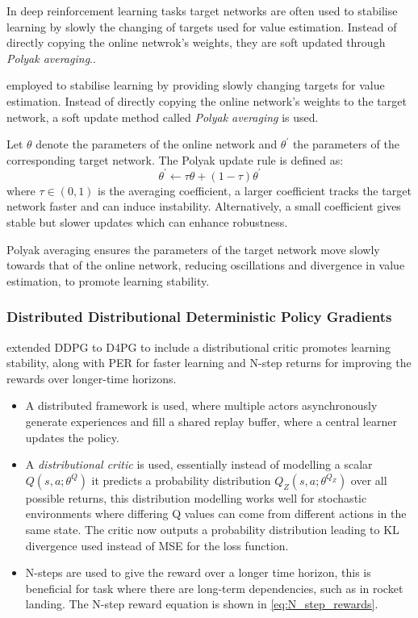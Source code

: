 \begin{tcolorbox}[title={\textbf{Lemma. Target network updates via Polyak averaging}}]
In deep reinforcement learning tasks target networks are often used to stabilise learning by slowly the changing of targets used for value estimation. Instead of directly copying the online netwrok's weights, they are soft updated through \textit{Polyak averaging}..

employed to stabilise learning by providing slowly changing targets for value estimation. Instead of directly copying the online network's weights to the target network, a soft update method called \textit{Polyak averaging} is used.

Let \( \theta \) denote the parameters of the online network and \( \theta^{'}\) the parameters of the corresponding target network. The Polyak update rule is defined as:
\[
    \theta^{'} \leftarrow \tau \theta + (1 - \tau) \theta^{'} 
\]
where \( \tau \in (0, 1) \) is the averaging coefficient, a larger coefficient tracks the target network faster and can induce instability. Alternatively, a small coefficient gives stable but slower updates which can enhance robustness.

Polyak averaging ensures the parameters of the target network move slowly towards that of the online network, reducing oscillations and divergence in value estimation, to promote learning stability.
\end{tcolorbox}

\subsubsection{Distributed Distributional Deterministic Policy Gradients}
\label{sec:D4PG}

\cite{barthmaron2018d4pg} extended DDPG to D4PG to include a distributional critic promotes learning stability, along with PER for faster learning and N-step returns for improving the rewards over longer-time horizons.
\begin{itemize}
    \item A distributed framework is used, where multiple actors asynchronously generate experiences and fill a shared replay buffer, where a central learner updates the policy.
    \item A \textit{distributional critic} is used, essentially instead of modelling a scalar \(Q(s,a; \theta^Q)\) it predicts a probability distribution \(Q_Z(s,a; \theta^{Q_Z})\) over all possible returns, this distribution modelling works well for stochastic environments where differing Q values can come from different actions in the same state. The critic now outputs a probability distribution leading to KL divergence used instead of MSE for the loss function.
    \item N-steps are used to give the reward over a longer time horizon, this is beneficial for task where there are long-term dependencies, such as in rocket landing. The N-step reward equation is shown in \autoref{eq:N_step_rewards}.
\end{itemize}

